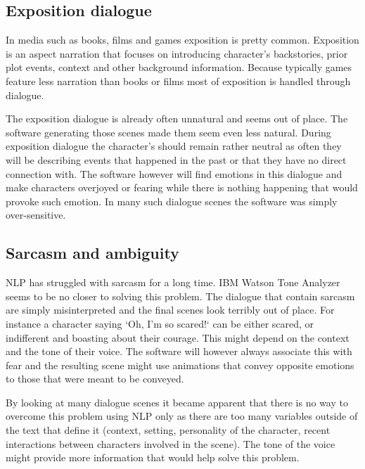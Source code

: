 \subsection{Exposition dialogue}
In media such as books, films and games exposition is pretty common. Exposition is an aspect narration that focuses on introducing character's backstories, prior plot events, context and other background information. Because typically games feature less narration than books or films most of exposition is handled through dialogue.

The exposition dialogue is already often unnatural and seems out of place. The software generating those scenes made them seem even less natural. During exposition dialogue the character's should remain rather neutral as often they will be describing events that happened in the past or that they have no direct connection with. The software however will find emotions in this dialogue and make characters overjoyed or fearing while there is nothing happening that would provoke such emotion. In many such dialogue scenes the software was simply over-sensitive.


\subsection{Sarcasm and ambiguity}
NLP has struggled with sarcasm for a long time. IBM Watson Tone Analyzer seems to be no closer to solving this problem. The dialogue that contain sarcasm are simply misinterpreted and the final scenes look terribly out of place. For instance a character saying `Oh, I'm so scared!` can be either scared, or indifferent and boasting about their courage. This might depend on the context and the tone of their voice. The software will however always associate this with fear and the resulting scene might use animations that convey opposite emotions to those that were meant to be conveyed.

By looking at many dialogue scenes it became apparent that there is no way to overcome this problem using NLP only as there are too many variables outside of the text that define it (context, setting, personality of the character, recent interactions between characters involved in the scene). The tone of the voice might provide more information that would help solve this problem.










